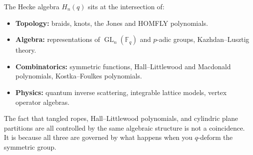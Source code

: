 \documentclass[12pt]{article}
\DeclareMathOperator{\GL}{GL}
\begin{document}
The Hecke algebra $H_n(q)$ sits at the intersection of:
\begin{itemize}
  \item \textbf{Topology:} braids, knots, the Jones and HOMFLY polynomials.
  \item \textbf{Algebra:} representations of $\GL_n(\mathbb{F}_q)$ and
    $p$-adic groups, Kazhdan--Lusztig theory.
  \item \textbf{Combinatorics:} symmetric functions, Hall--Littlewood and
    Macdonald polynomials, Kostka--Foulkes polynomials.
  \item \textbf{Physics:} quantum inverse scattering, integrable lattice
    models, vertex operator algebras.
\end{itemize}

The fact that tangled ropes, Hall--Littlewood polynomials, and cylindric
plane partitions are all controlled by the same algebraic structure is not
a coincidence. It is because all three are governed by what happens when
you $q$-deform the symmetric group.
\end{document}
